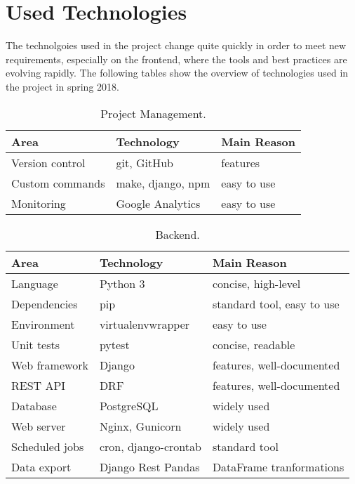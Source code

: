 \chapter{Used Technologies}
\label{chap:technologies}

The technolgoies used in the project change quite quickly in order to meet new requirements,
especially on the frontend, where the tools and best practices are evolving rapidly.
The following tables show the overview of technologies used in the project in spring 2018.


\begin{table}[htb]
\centering
\caption{Project Management.}
\begin{tabular}{l l l}
\toprule
Area & Technology & Main Reason  \\
\midrule
Version control & git, GitHub & features \\
Custom commands & make, django, npm & easy to use \\
Monitoring & Google Analytics & easy to use \\
\bottomrule
\end{tabular}
\end{table}

\begin{table}[htb]
\centering
\caption{Backend.}
\begin{tabular}{l l l}
\toprule
Area & Technology & Main Reason  \\
\midrule
Language & Python 3 & concise, high-level \\
Dependencies & pip & standard tool, easy to use \\
Environment & virtualenvwrapper & easy to use \\
Unit tests & pytest & concise, readable \\
Web framework & Django & features, well-documented \\
REST API & DRF & features, well-documented \\
Database & PostgreSQL & widely used \\
Web server & Nginx, Gunicorn & widely used \\
Scheduled jobs & cron, django-crontab & standard tool \\
Data export & Django Rest Pandas & DataFrame tranformations \\ %
\bottomrule
\end{tabular}
\end{table}

